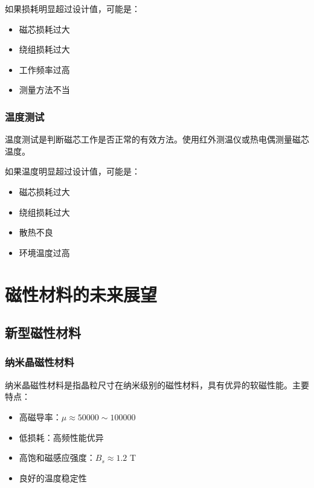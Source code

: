 \documentclass[12pt,UTF8]{ctexbook}
\begin{document}
如果损耗明显超过设计值，可能是：

\begin{itemize}[leftmargin=2cm]
    \item 磁芯损耗过大
    \item 绕组损耗过大
    \item 工作频率过高
    \item 测量方法不当
\end{itemize}

\subsection{温度测试}

温度测试是判断磁芯工作是否正常的有效方法。使用红外测温仪或热电偶测量磁芯温度。

如果温度明显超过设计值，可能是：

\begin{itemize}[leftmargin=2cm]
    \item 磁芯损耗过大
    \item 绕组损耗过大
    \item 散热不良
    \item 环境温度过高
\end{itemize}

\chapter{磁性材料的未来展望}

\section{新型磁性材料}

\subsection{纳米晶磁性材料}

纳米晶磁性材料是指晶粒尺寸在纳米级别的磁性材料，具有优异的软磁性能。主要特点：

\begin{itemize}[leftmargin=2cm]
    \item 高磁导率：$\mu \approx 50000 \sim 100000$
    \item 低损耗：高频性能优异
    \item 高饱和磁感应强度：$B_s \approx 1.2$ T
    \item 良好的温度稳定性
\end{itemize}
\end{document}
